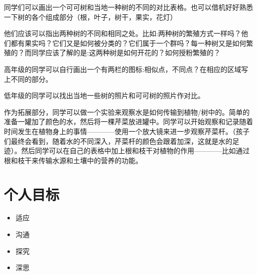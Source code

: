     \par
    同学们可以画出一个可可树和当地一种树的不同的对比表格。也可以借机好好熟悉一下树的各个组成部分（根，叶子，树干，果实，花灯）\par
    他们应该可以指出两种树的不同和相同之处。比如:两种树的繁殖方式一样吗？他们都有果实吗？它们又是如何被分类的？它们属于一个群吗？每一种树又是如何繁殖的？而同学应该了解的是:这两种树是如何开花的？如何授粉繁殖的？\par
    高年级的同学可以自行画出一个有两栏的图标:相似点，不同点？在相应的区域写上不同的部分。\par
    低年级的同学可以找出当地一些树的照片和可可树的照片作对比。\par
    作为拓展部分，同学可以做一个实验来观察水是如何传输到植物/树中的。简单的准备一罐加了颜色的水，然后将一棵芹菜放进罐中。同学可以开始观察和记录随着时间发生在植物身上的事情————使用一个放大镜来进一步观察芹菜杆。（孩子们最终会看到，随着水的不同深入，芹菜杆的颜色会跟着加深，这就是水的足迹）。然后同学可以在自己的表格中加上根和枝干对植物的作用————比如通过根和枝干来传输水源和土壤中的营养的功能。


\section{个人目标}
    \begin{itemize}
      \item 适应
      \item 沟通 
      \item 探究
      \item 深思
    \end{itemize}  
